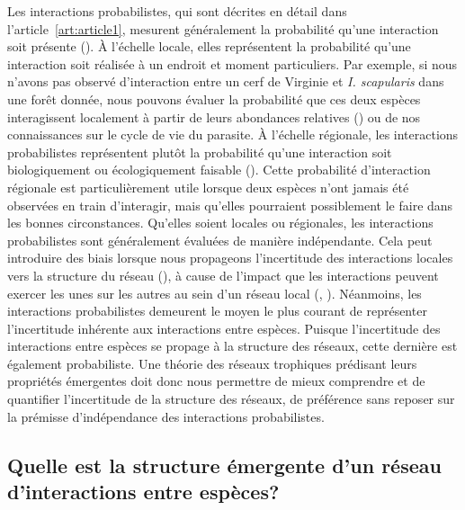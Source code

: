 Les interactions probabilistes, qui sont décrites en détail dans
l'article~\ref{art:article1}, mesurent généralement la probabilité qu'une
interaction soit présente (\cite{Poisot2016Structure}). À l'échelle locale,
elles représentent la probabilité qu'une interaction soit réalisée à un endroit
et moment particuliers. Par exemple, si nous n'avons pas observé d'interaction
entre un cerf de Virginie et \textit{I. scapularis} dans une forêt donnée, nous
pouvons évaluer la probabilité que ces deux espèces interagissent localement à
partir de leurs abondances relatives (\cite{Canard2014Empirical}) ou de nos
connaissances sur le cycle de vie du parasite. À l'échelle régionale, les
interactions probabilistes représentent plutôt la probabilité qu'une interaction
soit biologiquement ou écologiquement faisable (\cite{Strydom2023Grapha}). Cette
probabilité d'interaction régionale est particulièrement utile lorsque deux
espèces n'ont jamais été observées en train d'interagir, mais qu'elles
pourraient possiblement le faire dans les bonnes circonstances. Qu'elles soient
locales ou régionales, les interactions probabilistes sont généralement évaluées
de manière indépendante. Cela peut introduire des biais lorsque nous propageons
l'incertitude des interactions locales vers la structure du réseau
(\cite{Poisot2016Structure}), à cause de l'impact que les interactions peuvent
exercer les unes sur les autres au sein d'un réseau local
(\cite{Golubski2011Modifying}, \cite{Ims2013Indirect}). Néanmoins, les
interactions probabilistes demeurent le moyen le plus courant de représenter
l'incertitude inhérente aux interactions entre espèces. Puisque l'incertitude
des interactions entre espèces se propage à la structure des réseaux, cette
dernière est également probabiliste. Une théorie des réseaux trophiques
prédisant leurs propriétés émergentes doit donc nous permettre de mieux
comprendre et de quantifier l'incertitude de la structure des réseaux, de
préférence sans reposer sur la prémisse d'indépendance des interactions
probabilistes.


\subsection{Quelle est la structure émergente d'un réseau d'interactions entre espèces?} 

